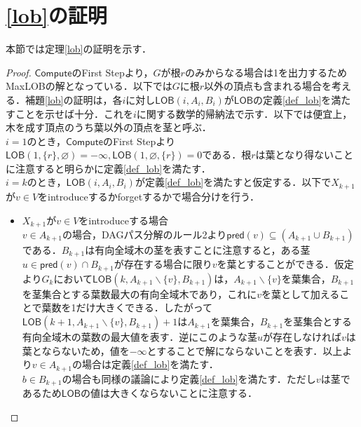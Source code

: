 \documentclass[master]{kuisthesis}		%
\theoremstyle{plain}
\theoremstyle{definition}
\begin{document}
{\section{\ref{lob}の証明}

本節では定理\ref{lob}の証明を示す．
   
\begin{proof}
    $\mathsf{Compute}$のFirst Stepより，$G$が根$r$のみからなる場合は1を出力するためMaxLOBの解となっている．以下では$G$に根$r$以外の頂点も含まれる場合を考える．補題\ref{lob}の証明は，各$i$に対し$\mathsf{LOB}(i, A_i, B_i)$が$\mathsf{LOB}$の定義\ref{def_lob}を満たすことを示せば十分．これを$i$に関する数学的帰納法で示す．以下では便宜上，木を成す頂点のうち葉以外の頂点を茎と呼ぶ．\\
    $i=1$のとき，$\mathsf{Compute}$のFirst Stepより$\mathsf{LOB}(1, \{r\}, \varnothing) = -\infty, \mathsf{LOB}(1, \varnothing, \{r\}) = 0$である．根$r$は葉となり得ないことに注意すると明らかに定義\ref{def_lob}を満たす．\\
    $i=k$のとき，$\mathsf{LOB}(i, A_i, B_i)$が定義\ref{def_lob}を満たすと仮定する．以下で$X_{k+1}$が$v \in V$をintroduceするかforgetするかで場合分けを行う．
    \begin{itemize}
        \item $X_{k+1}$が$v \in V$をintroduceする場合 \\
        $v \in A_{k+1}$の場合，DAGパス分解のルール2より$\mathsf{pred}(v) \subseteq (A_{k+1} \cup B_{k+1})$である．$B_{k+1}$は有向全域木の茎を表すことに注意すると，ある茎$u \in \mathsf{pred}(v) \cap B_{k+1}$が存在する場合に限り$v$を葉とすることができる．仮定より$G_k$において$\mathsf{LOB}(k, A_{k+1} \backslash \{v\}, B_{k+1})$は，$A_{k+1} \backslash \{v\}$を葉集合，$B_{k+1}$を茎集合とする葉数最大の有向全域木であり，これに$v$を葉として加えることで葉数を1だけ大きくできる．したがって$\mathsf{LOB}(k+1, A_{k+1} \backslash \{v\}, B_{k+1})+1$は$A_{k+1}$を葉集合，$B_{k+1}$を茎集合とする有向全域木の葉数の最大値を表す．逆にこのような茎$u$が存在しなければ$v$は葉とならないため，値を$-\infty$とすることで解にならないことを表す．以上より$v \in A_{k+1}$の場合は定義\ref{def_lob}を満たす．\\
        $b \in B_{k+1}$の場合も同様の議論により定義\ref{def_lob}を満たす．ただし$v$は茎であるため$\mathsf{LOB}$の値は大きくならないことに注意する．


\end{itemize}
\end{proof}}
\end{document}

